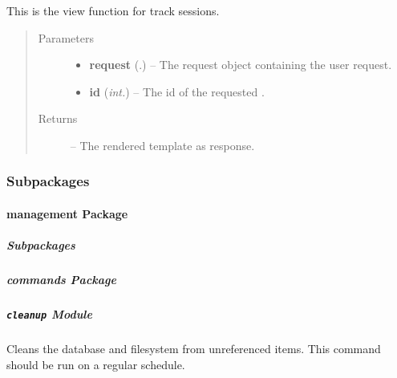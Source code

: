 \documentclass[letterpaper,10pt,english]{sphinxmanual}
\begin{document}
\begin{fulllineitems}
\label{Contour.contour:Contour.contour.views.track}
This is the view function for track sessions.
\begin{quote}\begin{description}
\item[{Parameters}] \leavevmode\begin{itemize}
\item {} 
\textbf{request} (.) -- The request object containing the user request.

\item {} 
\textbf{id} (\emph{int.}) -- The id of the requested {\hyperref[Contour.contour:Contour.contour.models.Track]{}}.

\end{itemize}

\item[{Returns}] \leavevmode
{} -- The rendered template as response.

\end{description}\end{quote}

\end{fulllineitems}



\subsubsection{Subpackages}
\label{Contour.contour:subpackages}

\paragraph{management Package}
\label{Contour.contour.management:management-package}\label{Contour.contour.management::doc}

\subparagraph{Subpackages}
\label{Contour.contour.management:subpackages}

\subparagraph{commands Package}
\label{Contour.contour.management.commands::doc}\label{Contour.contour.management.commands:commands-package}

\subparagraph{\texttt{cleanup} Module}
\label{Contour.contour.management.commands:module-Contour.contour.management.commands.cleanup}\label{Contour.contour.management.commands:cleanup-module}
Cleans the database and filesystem from unreferenced items. This command should be run on a regular schedule.
\end{document}
